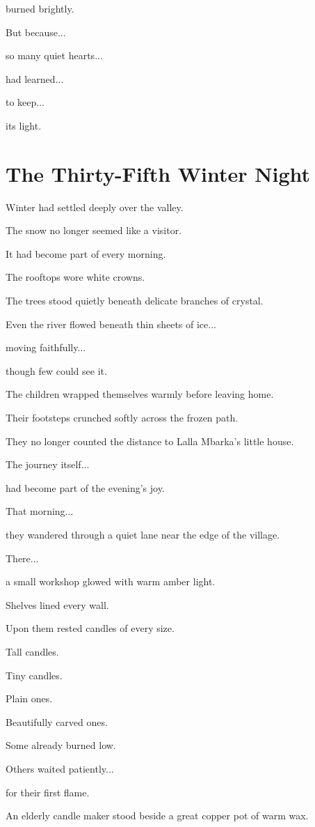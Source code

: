 \documentclass[12pt,openany]{book}
\begin{document}
burned brightly.

But because...

so many quiet hearts...

had learned...

to keep...

its light.
\chapter{The Thirty-Fifth Winter Night}

Winter had settled deeply over the valley.

The snow no longer seemed like a visitor.

It had become part of every morning.

The rooftops wore white crowns.

The trees stood quietly beneath delicate branches of crystal.

Even the river flowed beneath thin sheets of ice...

moving faithfully...

though few could see it.

The children wrapped themselves warmly before leaving home.

Their footsteps crunched softly across the frozen path.

They no longer counted the distance to Lalla Mbarka's little house.

The journey itself...

had become part of the evening's joy.

That morning...

they wandered through a quiet lane near the edge of the village.

There...

a small workshop glowed with warm amber light.

Shelves lined every wall.

Upon them rested candles of every size.

Tall candles.

Tiny candles.

Plain ones.

Beautifully carved ones.

Some already burned low.

Others waited patiently...

for their first flame.

An elderly candle maker stood beside a great copper pot of warm wax.
\end{document}
